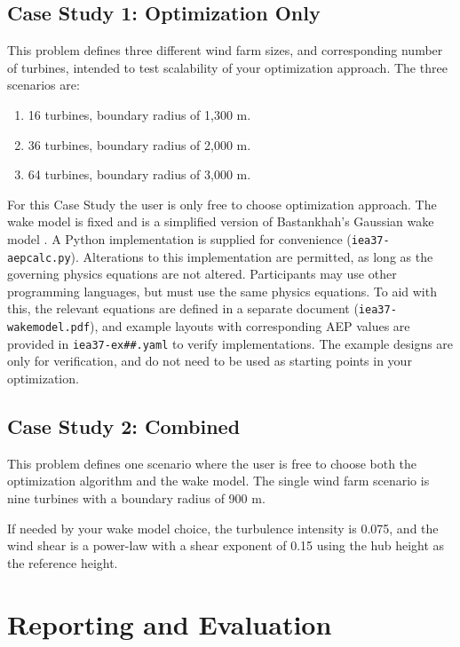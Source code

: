 \documentclass[10pt]{article}
\begin{document}
    \subsection{Case Study 1: Optimization Only}

        This problem defines three different wind farm sizes, and corresponding number of turbines, intended to test scalability of your optimization approach.  The three scenarios are:
        \begin{enumerate}
            \item 16 turbines, boundary radius of 1,300 m.
            \item 36 turbines, boundary radius of 2,000 m.
            \item 64 turbines, boundary radius of 3,000 m.
        \end{enumerate}

        For this Case Study the user is only free to choose optimization approach.
        The wake model is fixed and is a simplified version of Bastankhah's Gaussian wake model \cite{Thomas2018, Bastankhah2014, Bastankhah2016}.
        A Python implementation is supplied for convenience (\texttt{iea37-aepcalc.py}).
        Alterations to this implementation are permitted, as long as the governing physics equations are not altered.
        Participants may use other programming languages, but must use the same physics equations.
        To aid with this, the relevant equations are defined in a separate document (\texttt{iea37-wakemodel.pdf}), and example layouts with corresponding AEP values are provided in \texttt{iea37-ex\#\#.yaml} to verify implementations.
        The example designs are only for verification, and do not need to be used as starting points in your optimization.

    \subsection{Case Study 2: Combined}

        This problem defines one scenario where the user is free to choose both the optimization algorithm and the wake model.
        The single wind farm scenario is nine turbines with a boundary radius of 900 m.
        
        If needed by your wake model choice, the turbulence intensity is 0.075, and the wind shear is a power-law with a shear exponent of 0.15 using the hub height as the reference height.

\section{Reporting and Evaluation}
\end{document}
